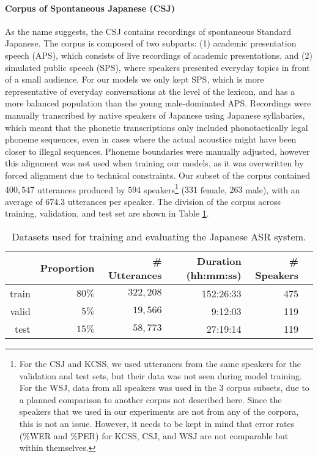\paragraph{Corpus of Spontaneous Japanese (CSJ)}
As the name suggests, the CSJ \cite{maekawa2003} contains recordings of spontaneous Standard Japanese. The corpus is composed of two subparts: (1) academic presentation speech (APS), which consists of live recordings of academic presentations, and (2) simulated public speech (SPS), where speakers presented everyday topics in front of a small audience. For our models we only kept SPS, which is more representative of everyday conversations at the level of the lexicon, and has a more balanced population than the young male-dominated APS.
Recordings were manually transcribed by native speakers of Japanese using Japanese syllabaries, which meant that the phonetic transcriptions only included phonotactically legal phoneme sequences, even in cases where the actual acoustics might have been closer to illegal sequences. Phoneme boundaries were manually adjusted, however this alignment was not used when training our models, as it was overwritten by forced alignment due to technical constraints.
Our subset of the corpus contained $400,547$ utterances produced by $594$ speakers\footnote{For the CSJ and KCSS, we used utterances from the same speakers for the validation and test sets, but their data was not seen during model training. For the WSJ, data from all speakers was used in the 3 corpus subsets, due to a planned comparison to another corpus not described here. Since the speakers that we used in our experiments are not from any of the corpora, this is not an issue. However, it needs to be kept in mind that error rates (\%WER and \%PER) for KCSS, CSJ, and WSJ are not comparable but within themselves.} ($331$ female, $263$ male), with an average of $674.3$ utterances per speaker. The division of the corpus across training, validation, and test set are shown in Table \ref{tab:hmm_csj}.

\begin{table}[htb]
\centering
\caption{Datasets used for training and evaluating the Japanese ASR system.}
\label{tab:hmm_csj}
\vspace{0.25cm}
\begin{tabular}{rrrrrr}
  \toprule
      & Proportion &\# Utterances & Duration (hh:mm:ss) & \# Speakers &  \\ \midrule
  train & $80\%$ &  $322,208$            & 152:26:33     &   475          &  \\
  valid & $5\%$ &  $19,566$         &  9:12:03    &   119          &  \\
  test  & $15\%$ &  $58,773$        &  27:19:14    &  119           & \\ \bottomrule
\end{tabular}
\end{table}

